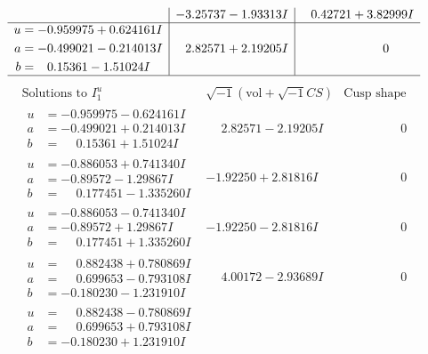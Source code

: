 \documentclass[1p]{elsarticle_modified}
\theoremstyle{definition}
\newcommand{\I}{\sqrt{-1}}
\begin{document}
$$\begin{array}{c|c|c}
 & -3.25737 - 1.93313 I & \phantom{-}0.42721 + 3.82999 I \\ \hline\begin{aligned}
u &= -0.959975 + 0.624161 I \\
a &= -0.499021 - 0.214013 I \\
b &= \phantom{-}0.15361 - 1.51024 I\end{aligned}
 & \phantom{-}2.82571 + 2.19205 I & \phantom{-0.000000 } 0\\
 \hline 
 \end{array}$$\newpage$$\begin{array}{c|c|c}  
\text{Solutions to }I^u_{1}& \I (\text{vol} + \sqrt{-1}CS) & \text{Cusp shape}\\
 \hline 
\begin{aligned}
u &= -0.959975 - 0.624161 I \\
a &= -0.499021 + 0.214013 I \\
b &= \phantom{-}0.15361 + 1.51024 I\end{aligned}
 & \phantom{-}2.82571 - 2.19205 I & \phantom{-0.000000 } 0 \\ \hline\begin{aligned}
u &= -0.886053 + 0.741340 I \\
a &= -0.89572 - 1.29867 I \\
b &= \phantom{-}0.177451 - 1.335260 I\end{aligned}
 & -1.92250 + 2.81816 I & \phantom{-0.000000 } 0 \\ \hline\begin{aligned}
u &= -0.886053 - 0.741340 I \\
a &= -0.89572 + 1.29867 I \\
b &= \phantom{-}0.177451 + 1.335260 I\end{aligned}
 & -1.92250 - 2.81816 I & \phantom{-0.000000 } 0 \\ \hline\begin{aligned}
u &= \phantom{-}0.882438 + 0.780869 I \\
a &= \phantom{-}0.699653 - 0.793108 I \\
b &= -0.180230 - 1.231910 I\end{aligned}
 & \phantom{-}4.00172 - 2.93689 I & \phantom{-0.000000 } 0 \\ \hline\begin{aligned}
u &= \phantom{-}0.882438 - 0.780869 I \\
a &= \phantom{-}0.699653 + 0.793108 I \\
b &= -0.180230 + 1.231910 I\end{aligned}

\end{array}$$
\end{document}
